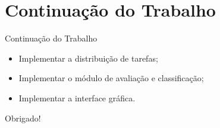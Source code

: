 \documentclass{beamer}
\begin{document}
  \section{Continua\c{c}\~ao do Trabalho}
  \begin{frame}{Continua\c{c}\~ao do Trabalho}
        \begin{itemize}
            \item Implementar a distribui\c{c}\~ao de tarefas;
            \item Implementar o m\'odulo de avalia\c{c}\~ao e classifica\c{c}\~ao;
            \item Implementar a interface gr\'afica.
        \end{itemize}
  \end{frame}
  \begin{frame}
    \begin{center}
  Obrigado!
\end{center}

  \end{frame}
\end{document}
